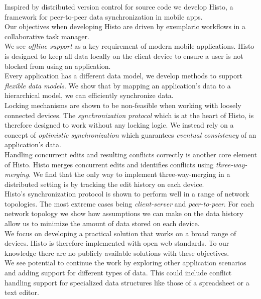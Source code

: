 

Inspired by distributed version control for source code we develop Histo, a framework for peer-to-peer data synchronization in mobile apps.\\
Our objectives when developing Histo are driven by exemplaric workflows in a collaborative task manager.\\
We see \emph{offline support} as a key requirement of modern mobile applications.
Histo is designed to keep all data locally on the client device to ensure a user is not blocked from using an application.\\
Every application has a different data model, we develop methods to support \emph{flexible data models}.
We show that by mapping an application's data to a hierarchical model, we can efficiently synchronize data.\\
Locking mechanisms are shown to be non-feasible when working with loosely connected devices.
The \emph{synchronization protocol} which is at the heart of Histo, is therefore designed to work without any locking logic.
We instead rely on a concept of \emph{optimistic synchronization} which guarantees \emph{eventual consistency} of an application's data.\\
Handling concurrent edits and resulting conflicts correctly is another core element of Histo.
Histo merges concurrent edits and identifies conflicts using \emph{three-way-merging}.
We find that the only way to implement three-way-merging in a distributed setting is by tracking the edit history on each device.\\
Histo's synchronization protocol is shown to perform well in a range of network topologies.
The most extreme cases being \emph{client-server} and \emph{peer-to-peer}.
For each network topology we show how assumptions we can make on the data history allow us to minimize the amount of data stored on each device.\\
We focus on developing a practical solution that works on a broad range of devices.
Histo is therefore implemented with open web standards.
To our knowledge there are no publicly available solutions with these objectives.\\
We see potential to continue the work by exploring other application scenarios and adding support for different types of data.
This could include conflict handling support for specialized data structures like those of a spreadsheet or a text editor.
